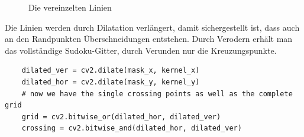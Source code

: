 \begin{figure}[H]
    \hfill
    \caption{Die vereinzelten Linien}
\end{figure}

Die Linien werden durch Dilatation verlängert, damit sichergestellt ist, dass auch an den Randpunkten Überschneidungen entstehen.
Durch Verodern erhält man das vollständige Sudoku-Gitter, durch Verunden nur die Kreuzungspunkte.

\begin{lstlisting}
    dilated_ver = cv2.dilate(mask_x, kernel_x)
    dilated_hor = cv2.dilate(mask_y, kernel_y)
    # now we have the single crossing points as well as the complete grid
    grid = cv2.bitwise_or(dilated_hor, dilated_ver)
    crossing = cv2.bitwise_and(dilated_hor, dilated_ver)
\end{lstlisting}


